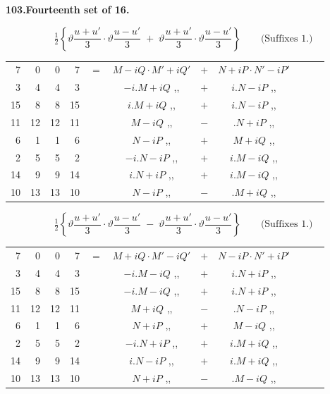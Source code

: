 \documentclass[11pt]{article}
\newcommand{\half}{\tfrac{1}{2}}
\begin{document}
\medskip
\begin{center}\textbf{103.\quad Fourteenth set of 16.}\end{center}

\[
\half\!\left\{\vartheta\frac{u+u'}{3}\cdot\vartheta\frac{u-u'}{3}\;+\;\vartheta\frac{u+u'}{3}\cdot\vartheta\frac{u-u'}{3}\right\}\qquad\text{(Suffixes 1.)}
\]
{\small
\begin{center}
\begin{tabular}{rrrrr@{\ }c@{\ }lcr@{\ }c@{\ }l}
7  & 0  & 0  & 7  & $=$ & $M-iQ\cdot M'+iQ'$ & $+$ & $N+iP\cdot N'-iP'$ \\
3  & 4  & 4  & 3  & & $-i.M+iQ$ \quad ,, & $+$ & $i.N-iP$ \quad ,, \\
15 & 8  & 8  & 15 & & $i.M+iQ$ \quad ,, & $+$ & $i.N-iP$ \quad ,, \\
11 & 12 & 12 & 11 & & $M-iQ$ \quad ,, & $-$ & $.N+iP$ \quad ,, \\
6  & 1  & 1  & 6  & & $N-iP$ \quad ,, & $+$ & $M+iQ$ \quad ,, \\
2  & 5  & 5  & 2  & & $-i.N-iP$ \quad ,, & $+$ & $i.M-iQ$ \quad ,, \\
14 & 9  & 9  & 14 & & $i.N+iP$ \quad ,, & $+$ & $i.M-iQ$ \quad ,, \\
10 & 13 & 13 & 10 & & $N-iP$ \quad ,, & $-$ & $.M+iQ$ \quad ,, \\
\end{tabular}
\end{center}
}

\[
\half\!\left\{\vartheta\frac{u+u'}{3}\cdot\vartheta\frac{u-u'}{3}\;-\;\vartheta\frac{u+u'}{3}\cdot\vartheta\frac{u-u'}{3}\right\}\qquad\text{(Suffixes 1.)}
\]
{\small
\begin{center}
\begin{tabular}{rrrrr@{\ }c@{\ }lcr@{\ }c@{\ }l}
7  & 0  & 0  & 7  & $=$ & $M+iQ\cdot M'-iQ'$ & $+$ & $N-iP\cdot N'+iP'$ \\
3  & 4  & 4  & 3  & & $-i.M-iQ$ \quad ,, & $+$ & $i.N+iP$ \quad ,, \\
15 & 8  & 8  & 15 & & $-i.M-iQ$ \quad ,, & $+$ & $i.N+iP$ \quad ,, \\
11 & 12 & 12 & 11 & & $M+iQ$ \quad ,, & $-$ & $.N-iP$ \quad ,, \\
6  & 1  & 1  & 6  & & $N+iP$ \quad ,, & $+$ & $M-iQ$ \quad ,, \\
2  & 5  & 5  & 2  & & $-i.N+iP$ \quad ,, & $+$ & $i.M+iQ$ \quad ,, \\
14 & 9  & 9  & 14 & & $i.N-iP$ \quad ,, & $+$ & $i.M+iQ$ \quad ,, \\
10 & 13 & 13 & 10 & & $N+iP$ \quad ,, & $-$ & $.M-iQ$ \quad ,, \\
\end{tabular}
\end{center}
}
\end{document}
